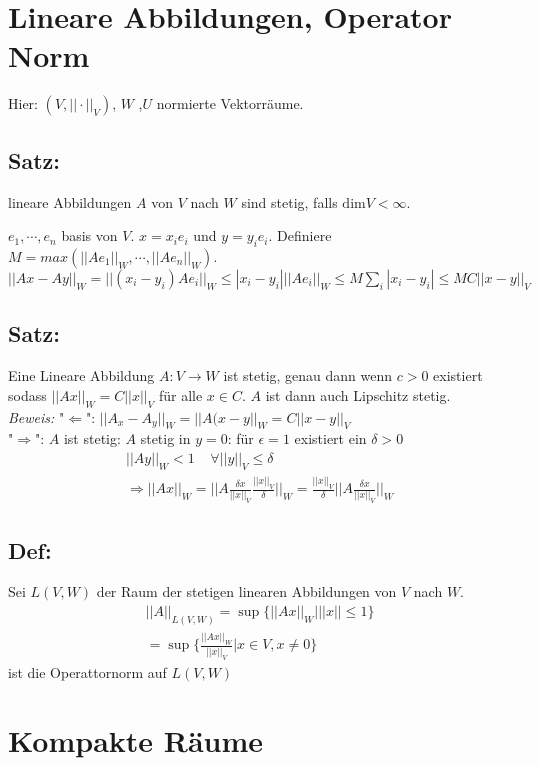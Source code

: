\section{Lineare Abbildungen, Operator Norm}

Hier: $(V,||\cdot||_V)$, $W$ ,$U$ normierte Vektorräume.

\subsection{Satz:}
lineare Abbildungen $A$ von $V$ nach $W$ sind stetig, falls $\text{dim} V <\infty$.

$e_1,\cdots,e_n$ basis von $V$. $x= x_ie_i$ und $y = y_i e_i$. Definiere $M = max (||Ae_1||_W ,\cdots, ||Ae_n||_W)$.\\
$||Ax - Ay||_W = ||(x_i - y_i) A e_i||_W \leq |x_i - y_i|||Ae_i||_W \leq M \sum_i |x_i - y_i| \leq MC||x-y||_V$

\subsection{Satz: }
Eine Lineare Abbildung $A:V\rightarrow W$ ist stetig, genau dann wenn $c>0$ existiert sodass $||Ax||_W = C||x||_V$ für alle $x\in C$. $A$ ist dann auch Lipschitz stetig.\\
\textit{Beweis: } "$\Leftarrow$": $||A_x - A_y||_W = ||A(x-y||_W = C||x-y||_V$\\
"$\Rightarrow$": $A$ ist stetig: $A$ stetig in $y = 0$: für $\epsilon = 1$ existiert ein $\delta>0$ 
\begin{gather}
	||Ay||_W < 1 \;\;\;\;\forall ||y||_V \leq \delta\\
	\Rightarrow ||Ax||_W = ||A \frac{\delta x}{||x||_V}\frac{||x||_V}{\delta}||_W = \frac{||x||_V}{\delta}||A \frac{\delta x}{||x||_V}||_W
\end{gather}

\subsection{Def: }
Sei $L(V,W)$ der Raum der stetigen linearen Abbildungen von $V$ nach $W$.
\begin{gather}
	||A||_{L(V,W)} = \sup\{||Ax||_W | ||x||\leq 1\}\\
	= \sup\{\frac{||Ax||_W}{||x||_V} | x\in V, x\neq 0\}
\end{gather}
ist die Operattornorm auf $L(V,W)$

\section{Kompakte Räume}

